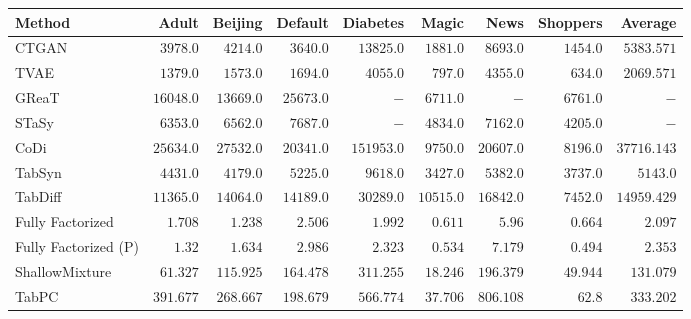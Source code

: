 \begin{tabular}{lrrrrrrr|r}
    \toprule[0.8pt]
     \textbf{Method} & \textbf{Adult} & \textbf{Beijing} & \textbf{Default} & \textbf{Diabetes} & \textbf{Magic} & \textbf{News} & \textbf{Shoppers} & \textbf{Average} \\
    \midrule 
    CTGAN & $3978.0$ & $4214.0$ & $3640.0$ & $13825.0$ & $1881.0$ & $8693.0$ & $1454.0$ & $5383.571$ \\
    TVAE & $1379.0$ & $1573.0$ & $1694.0$ & $4055.0$ & $797.0$ & $4355.0$ & $634.0$ & $2069.571$ \\
    GReaT & $16048.0$ & $13669.0$ & $25673.0$ & $-$ & $6711.0$ & $-$ & $6761.0$ & $-$ \\
    STaSy & $6353.0$ & $6562.0$ & $7687.0$ & $-$ & $4834.0$ & $7162.0$ & $4205.0$ & $-$ \\
    CoDi & $25634.0$ & $27532.0$ & $20341.0$ & $151953.0$ & $9750.0$ & $20607.0$ & $8196.0$ & $37716.143$ \\
    TabSyn & $4431.0$ & $4179.0$ & $5225.0$ & $9618.0$ & $3427.0$ & $5382.0$ & $3737.0$ & $5143.0$ \\
    TabDiff & $11365.0$ & $14064.0$ & $14189.0$ & $30289.0$ & $10515.0$ & $16842.0$ & $7452.0$ & $14959.429$ \\
    \midrule
    Fully Factorized & $1.708$ & $1.238$ & $2.506$ & $1.992$ & $0.611$ & $5.96$ & $0.664$ & $2.097$ \\
    Fully Factorized (P) & $1.32$ & $1.634$ & $2.986$ & $2.323$ & $0.534$ & $7.179$ & $0.494$ & $2.353$ \\
    ShallowMixture & $61.327$ & $115.925$ & $164.478$ & $311.255$ & $18.246$ & $196.379$ & $49.944$ & $131.079$ \\
    TabPC & $391.677$ & $268.667$ & $198.679$ & $566.774$ & $37.706$ & $806.108$ & $62.8$ & $333.202$ \\
    \bottomrule[1.0pt]
\end{tabular}